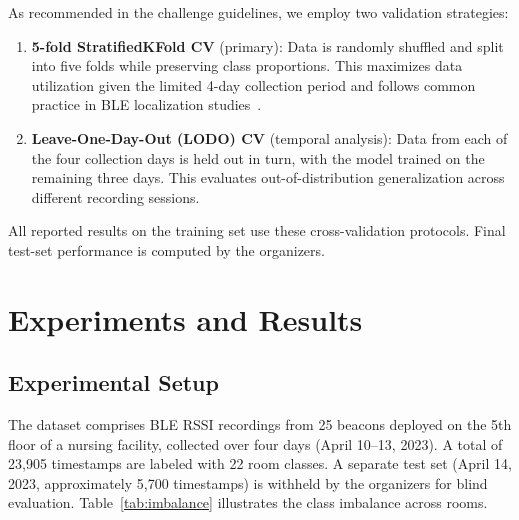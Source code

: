 \documentclass{iopconfser}
\begin{document}
As recommended in the challenge guidelines, we employ two validation strategies:

\begin{enumerate}
    \item \textbf{5-fold StratifiedKFold CV} (primary): Data is randomly shuffled and split into five folds while preserving class proportions. This maximizes data utilization given the limited 4-day collection period and follows common practice in BLE localization studies~\cite{ayub2025, garcia2021}.
    \item \textbf{Leave-One-Day-Out (LODO) CV} (temporal analysis): Data from each of the four collection days is held out in turn, with the model trained on the remaining three days. This evaluates out-of-distribution generalization across different recording sessions.
\end{enumerate}

\noindent All reported results on the training set use these cross-validation protocols. Final test-set performance is computed by the organizers.

\section{Experiments and Results}
\label{sec:experiments}

\subsection{Experimental Setup}

The dataset comprises BLE RSSI recordings from 25 beacons deployed on the 5th floor of a nursing facility, collected over four days (April 10--13, 2023). A total of 23,905 timestamps are labeled with 22 room classes. A separate test set (April 14, 2023, approximately 5,700 timestamps) is withheld by the organizers for blind evaluation. Table~\ref{tab:imbalance} illustrates the class imbalance across rooms.
\end{document}
